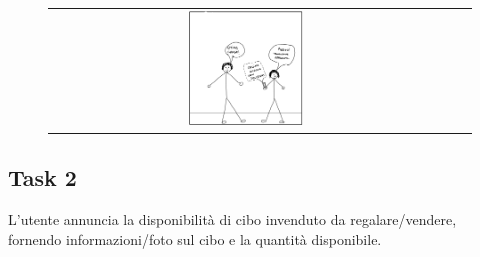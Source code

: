 \documentclass{article}
\begin{document}
\begin{figure}[H]
\begin{tabular}{ccc}
        \includegraphics[width=0.3\textwidth]{Storyboard/task1-img II versione/t1.6.png} \\
    \end{tabular}
    \label{fig:task1}
\end{figure}


\newpage
\subsection{Task 2}
L'utente annuncia la disponibilità di cibo invenduto da regalare/vendere, fornendo informazioni/foto sul cibo e la quantità disponibile.
\end{document}
